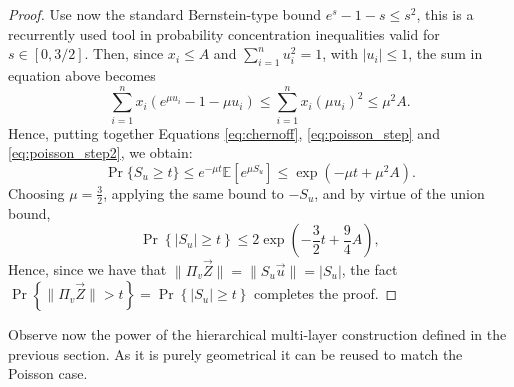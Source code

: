 \documentclass[10pt, conference]{IEEEtran}
\newcommand{\1}{\mathds{1}}
\newcommand{\EE}{\mathbb{E}}
\begin{document}
\begin{proof}
Use now the standard Bernstein-type bound $e^s-1-s \leq s^2$, this is a recurrently used tool in probability concentration inequalities \cite{Vershynin:high_dimensions_book} valid for $s\in[0,3/2]$. Then, since $x_i\leq A$ and $\sum_{i=1}^nu_i^2=1$, with $|u_i|\leq 1$, the sum in equation above becomes
\begin{equation}\label{eq:poisson_step2}
\sum_{i=1}^nx_i(e^{\mu u_i}-1-\mu u_i)\leq \sum_{i=1}^nx_i(\mu u_i)^2\leq\mu^2 A.
\end{equation}
Hence, putting together Equations \eqref{eq:chernoff}, \eqref{eq:poisson_step} and \eqref{eq:poisson_step2}, we obtain:
\begin{equation}
\Pr\{S_u\geq t\}\leq e^{-\mu t}\EE[e^{\mu S_u}] \leq \exp\left(-\mu t+\mu^2 A\right).
\end{equation}
Choosing $\mu=\frac32$, applying the same bound to $-S_u$, and by virtue of the union bound,
\begin{equation}
\Pr\left\{|S_u|\geq t\right\}\leq2 \exp\left(-\frac32 t+\frac94 A\right), 
\end{equation}
Hence, since we have that $\|\Pi_v\vec Z\|=\|S_u\vec u\|=|S_u|$, the fact $\Pr\left\{\|\Pi_{v}\vec Z\|>t\right\}=\Pr\left\{|S_u|\geq t\right\}$ completes the proof.
\end{proof}

Observe now the power of the hierarchical multi-layer construction defined in the previous section. As it is purely geometrical it can be reused to match the Poisson case.
\end{document}
